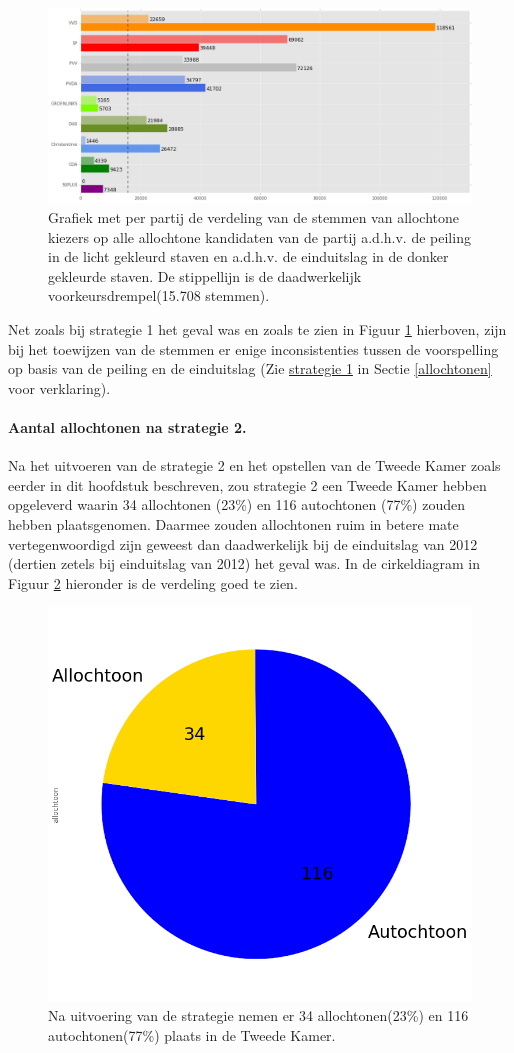 \begin{figure}[H]

	\includegraphics[width=\linewidth]	{stemmen_op_allochtonen_willekeurig_samen2.png}

			\caption{Grafiek met per partij de verdeling van de stemmen van allochtone kiezers op alle allochtone kandidaten van de partij a.d.h.v. de peiling \citep{Opiniehuis} in de licht gekleurd staven en a.d.h.v. de einduitslag \citep{Kiesraad_databank} in de donker gekleurde staven. De stippellijn is de daadwerkelijk voorkeursdrempel(15.708 stemmen).}

\label{fig:stemmenS2A}
\end{figure}

Net zoals bij strategie 1 het geval was en zoals te zien in Figuur \ref{fig:stemmenS2A} hierboven, zijn bij het toewijzen van de stemmen er enige inconsistenties tussen de voorspelling op basis van de peiling en de einduitslag (Zie \hyperref[S1A]{strategie 1} in Sectie \ref{allochtonen} voor verklaring).

\paragraph{Aantal allochtonen na strategie 2.}
Na het uitvoeren van de strategie 2 en het opstellen van de Tweede Kamer zoals eerder in dit hoofdstuk beschreven, zou strategie 2 een Tweede Kamer hebben opgeleverd waarin 34 allochtonen (23\%) en 116 autochtonen (77\%) zouden hebben plaatsgenomen. Daarmee zouden allochtonen ruim in betere mate vertegenwoordigd zijn geweest dan daadwerkelijk bij de einduitslag van 2012 (dertien zetels bij einduitslag van 2012) het geval was. In de cirkeldiagram in Figuur \ref{fig:pcS2A} hieronder is de verdeling goed te zien. 


\begin{figure}[H]
\centering
	\includegraphics[width=0.35\linewidth]{pie_chart_topN_allochtonen.png}

			\caption{Na uitvoering van de strategie nemen er 34 allochtonen(23\%) en 116 autochtonen(77\%) plaats in de Tweede Kamer.}

\label{fig:pcS2A}
\end{figure}


